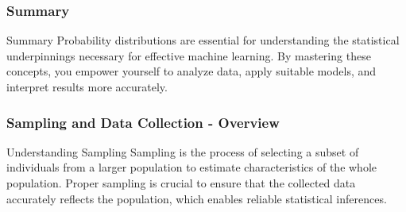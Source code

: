 \documentclass{beamer}
\begin{document}
\begin{frame}[fragile]
    \frametitle{Summary}
    \begin{block}{Summary}
        Probability distributions are essential for understanding the statistical underpinnings necessary for effective machine learning. By mastering these concepts, you empower yourself to analyze data, apply suitable models, and interpret results more accurately.
    \end{block}
\end{frame}

\begin{frame}[fragile]
    \frametitle{Sampling and Data Collection - Overview}
    \begin{block}{Understanding Sampling}
        Sampling is the process of selecting a subset of individuals from a larger population to estimate characteristics of the whole population. Proper sampling is crucial to ensure that the collected data accurately reflects the population, which enables reliable statistical inferences.
    \end{block}
\end{frame}
\end{document}

